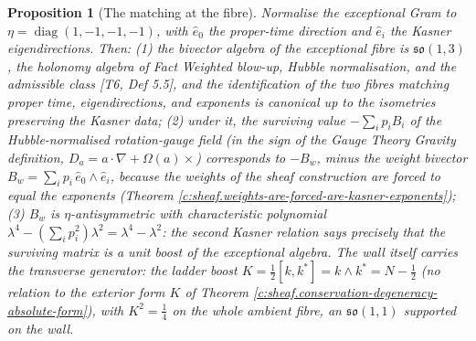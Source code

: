 \documentclass[11pt]{article}
\newtheorem{proposition}[theorem]{Proposition}
\theoremstyle{definition}
\theoremstyle{plain}
\newcommand{\changedmark}[2]{\marginpar{\raggedright\scriptsize\color{#1}#2}}
\begin{document}
\begin{proposition}[The matching at the fibre]\label{c:sheaf.matching-fibre}
\changedmark{BurntOrange}{changed since the deposit}
Normalise the exceptional Gram to $\eta = \operatorname{diag}(1,-1,-1,-1)$, with $\hat e_0$ the proper-time direction and $\hat e_i$ the Kasner eigendirections. Then: (1) the bivector algebra of the exceptional fibre is $\mathfrak{so}(1,3)$, the holonomy algebra of Fact \emph{Weighted blow-up, Hubble normalisation, and the admissible class} [T6, Def 5.5], and the identification of the two fibres matching proper time, eigendirections, and exponents is canonical up to the isometries preserving the Kasner data; (2) under it, the surviving value $-\sum_i p_i B_i$ of the Hubble-normalised rotation-gauge field (in the sign of the Gauge Theory Gravity definition, $D_a = a \cdot \nabla + \Omega(a) \times$) corresponds to $-B_w$, minus the \emph{weight bivector} $B_w = \sum_i p_i\,\hat e_0 \wedge \hat e_i$, because the weights of the sheaf construction are forced to equal the exponents (Theorem \ref{c:sheaf.weights-are-forced-are-kasner-exponents}); (3) $B_w$ is $\eta$-antisymmetric with characteristic polynomial $\lambda^4 - (\sum_i p_i^2)\lambda^2 = \lambda^4 - \lambda^2$: \emph{the second Kasner relation says precisely that the surviving matrix is a unit boost of the exceptional algebra}. The wall itself carries the transverse generator: the ladder boost $K = \tfrac12[k,k^*] = k \wedge k^* = N - \tfrac12$ (no relation to the exterior form $K$ of Theorem \ref{c:sheaf.conservation-degeneracy-absolute-form}), with $K^2 = \tfrac14$ on the whole ambient fibre, an $\mathfrak{so}(1,1)$ supported on the wall.
\end{proposition}
\end{document}
